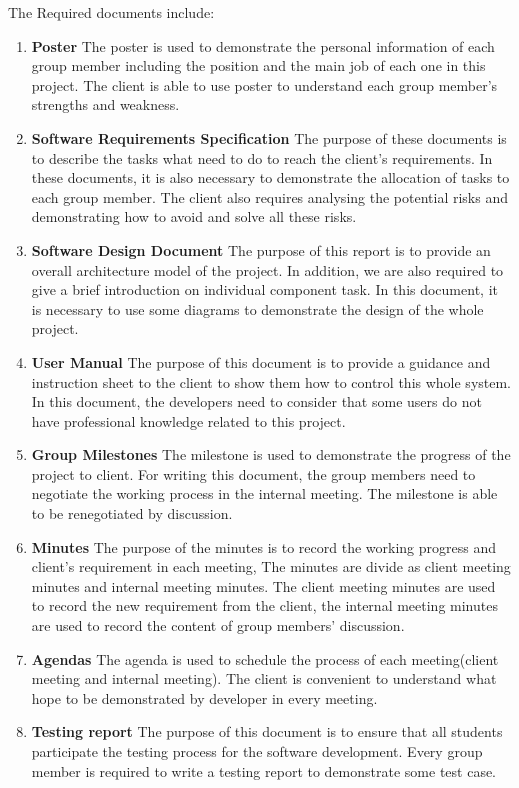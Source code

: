 \documentclass[11pt, a4paper]{report}
\begin{document}
The Required documents include:
\begin{enumerate}
	\item{\textbf{Poster} } The poster is used to demonstrate the personal information of each group member including the position and the main job of each one in this project. The client is able to use poster to understand each group member's strengths and weakness.
	\item{\textbf{Software Requirements Specification} } The purpose of these documents is to describe the tasks what need to do to reach the client's requirements. In these documents, it is also necessary to demonstrate the allocation of tasks to each group member. The client also requires analysing the potential risks and demonstrating how to avoid and solve all these risks. 
	\item{\textbf{Software Design Document} } The purpose of this report is to provide an overall architecture model of the project. In addition, we are also required to give a brief introduction on individual component task. In this document, it is necessary to use some diagrams to demonstrate the design of the whole project. 
	\item{\textbf{User Manual} } The purpose of this document is to provide a guidance and instruction sheet to the client to show them how to control this whole system. In this document, the developers need to consider that some users do not have professional knowledge related to this project.
	\item{\textbf{Group Milestones} } The milestone is used to demonstrate the progress of the project to client. For writing this document, the group members need to negotiate the working process in the internal meeting. The milestone is able to be renegotiated by discussion.
	\item{\textbf{Minutes} } The purpose of the minutes is to record the working progress and client's requirement in each meeting, The minutes are divide as client meeting minutes and internal meeting minutes. The client meeting minutes are used to record the new requirement from the client, the internal meeting minutes are used to record the content of group members' discussion.
	\item{\textbf{Agendas} } The agenda is used to schedule the process of each meeting(client meeting and internal meeting). The client is convenient to understand what hope to be demonstrated by developer in every meeting.
	\item{\textbf{Testing report} } The purpose of this document is to ensure that all students participate the testing process for the software development. Every group member is required to write a testing report to demonstrate some test case.  
\end{enumerate}
     
\end{document}
